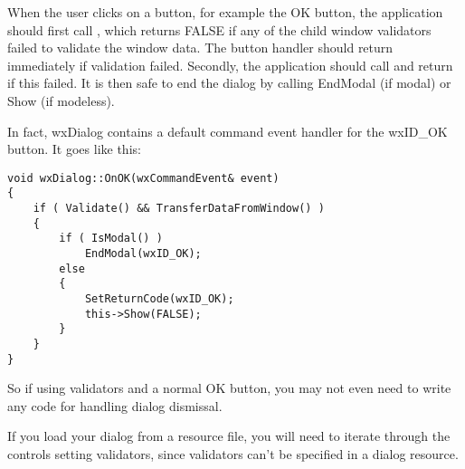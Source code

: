 
When the user clicks on a button, for example the OK button, the application should
first call , which returns FALSE if
any of the child window validators failed to validate the window data. The button handler
should return immediately if validation failed. Secondly, the application should
call  and
return if this failed. It is then safe to end the dialog by calling EndModal (if modal)
or Show (if modeless).

In fact, wxDialog contains a default command event handler for the wxID\_OK button. It goes like
this:

\begin{verbatim}
void wxDialog::OnOK(wxCommandEvent& event)
{
	if ( Validate() && TransferDataFromWindow() )
	{
        if ( IsModal() )
            EndModal(wxID_OK);
        else
        {
		    SetReturnCode(wxID_OK);
		    this->Show(FALSE);
        }
	}
}
\end{verbatim}

So if using validators and a normal OK button, you may not even need to write any
code for handling dialog dismissal.

If you load your dialog from a resource file, you will need to iterate through the controls
setting validators, since validators can't be specified in a dialog resource.

